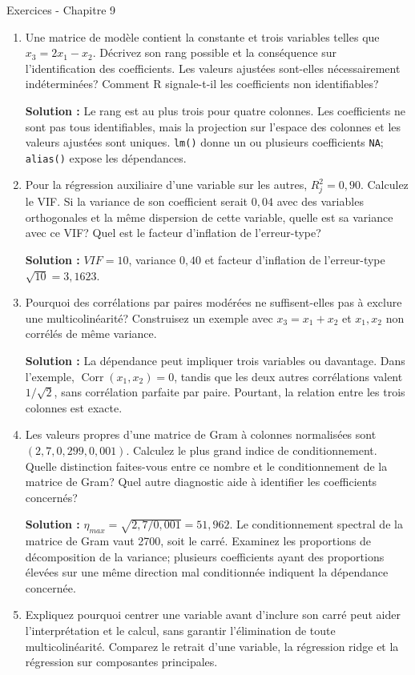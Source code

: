 \documentclass[letterpaper,11pt]{article}
\newcommand{\prof}[1]{\ifdefined\avecsolutions\par{\color{blue}\textbf{Solution :} #1}\par\fi}
\begin{document}
\begin{center}{\Large Exercices - Chapitre 9}\end{center}
\begin{enumerate}[leftmargin=*,wide,label=\bfseries Exercice \arabic*:]
\item Une matrice de modèle contient la constante et trois variables telles que $x_3=2x_1-x_2$. Décrivez son rang possible et la conséquence sur l'identification des coefficients. Les valeurs ajustées sont-elles nécessairement indéterminées? Comment R signale-t-il les coefficients non identifiables?
\prof{Le rang est au plus trois pour quatre colonnes. Les coefficients ne sont pas tous identifiables, mais la projection sur l'espace des colonnes et les valeurs ajustées sont uniques. \texttt{lm()} donne un ou plusieurs coefficients \texttt{NA}; \texttt{alias()} expose les dépendances.}
\item Pour la régression auxiliaire d'une variable sur les autres, $R_j^2=0{,}90$. Calculez le VIF. Si la variance de son coefficient serait $0{,}04$ avec des variables orthogonales et la même dispersion de cette variable, quelle est sa variance avec ce VIF? Quel est le facteur d'inflation de l'erreur-type?
\prof{$VIF=10$, variance $0{,}40$ et facteur d'inflation de l'erreur-type $\sqrt{10}=3{,}1623$.}
\item Pourquoi des corrélations par paires modérées ne suffisent-elles pas à exclure une multicolinéarité? Construisez un exemple avec $x_3=x_1+x_2$ et $x_1,x_2$ non corrélés de même variance.
\prof{La dépendance peut impliquer trois variables ou davantage. Dans l'exemple, $\operatorname{Corr}(x_1,x_2)=0$, tandis que les deux autres corrélations valent $1/\sqrt2$, sans corrélation parfaite par paire. Pourtant, la relation entre les trois colonnes est exacte.}
\item Les valeurs propres d'une matrice de Gram à colonnes normalisées sont $(2{,}7,0{,}299,0{,}001)$. Calculez le plus grand indice de conditionnement. Quelle distinction faites-vous entre ce nombre et le conditionnement de la matrice de Gram? Quel autre diagnostic aide à identifier les coefficients concernés?
\prof{$\eta_{max}=\sqrt{2{,}7/0{,}001}=51{,}962$. Le conditionnement spectral de la matrice de Gram vaut 2700, soit le carré. Examinez les proportions de décomposition de la variance; plusieurs coefficients ayant des proportions élevées sur une même direction mal conditionnée indiquent la dépendance concernée.}
\item Expliquez pourquoi centrer une variable avant d'inclure son carré peut aider l'interprétation et le calcul, sans garantir l'élimination de toute multicolinéarité. Comparez le retrait d'une variable, la régression ridge et la régression sur composantes principales.

\end{enumerate}
\end{document}
